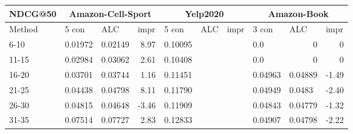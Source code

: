 \begin{table*}[h!]
    \centering
    \begin{tabular}{|l|r|r|r||l|r|r||l|l|l|}
        \hline
        NDCG@50 & \multicolumn{3}{c||}{Amazon-Cell-Sport} & \multicolumn{3}{c||}{Yelp2020} & \multicolumn{3}{c|}{Amazon-Book}                                                                                                                                                  \\ \hline
        Method  & \multicolumn{1}{l|}{5 con}              & \multicolumn{1}{l|}{ALC}       & \multicolumn{1}{l||}{impr}       & \multicolumn{1}{l|}{5 con} & \multicolumn{1}{l|}{ALC} & \multicolumn{1}{l||}{impr} & 3 con   & ALC                    & impr                   \\ \hline
        6-10    & 0.01972                                 & 0.02149                        & 8.97                             & 0.10095                    &                          &                            & 0.0     & \multicolumn{1}{r|}{0} & \multicolumn{1}{r|}{0} \\ \hline
        11-15   & 0.02984                                 & 0.03062                        & 2.61                             & 0.10408                    &                          &                            & 0.0     & \multicolumn{1}{r|}{0} & \multicolumn{1}{r|}{0} \\ \hline
        16-20   & 0.03701                                 & 0.03744                        & 1.16                             & 0.11451                    &                          &                            & 0.04963 & 0.04889                & -1.49                  \\ \hline
        21-25   & 0.04438                                 & 0.04798                        & 8.11                             & 0.11790                    &                          &                            & 0.04949 & 0.0483                 & -2.40                  \\ \hline
        26-30   & 0.04815                                 & 0.04648                        & -3.46                            & 0.11909                    &                          &                            & 0.04843 & 0.04779                & -1.32                  \\ \hline
        31-35   & 0.07514                                 & 0.07727                        & 2.83                             & 0.12833                    &                          &                            & 0.04907 & 0.04798                & -2.22                  \\ \hline

\end{tabular}
\end{table*}

